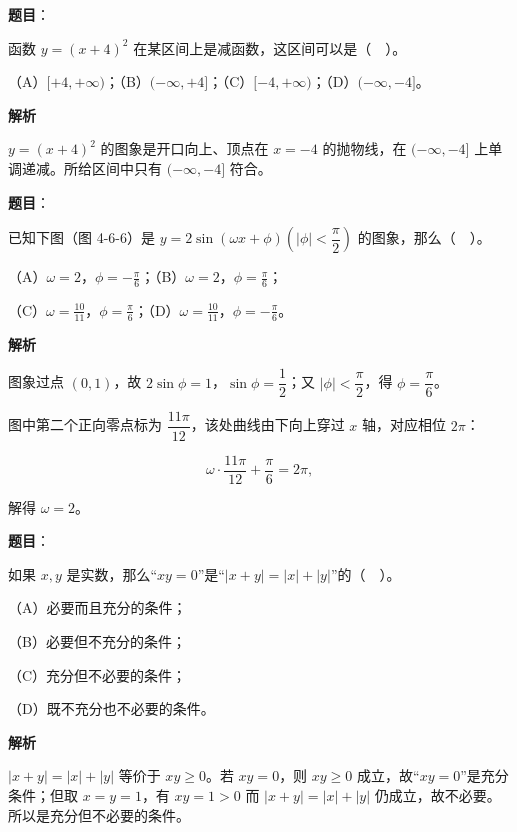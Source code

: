 \begin{answer}

\textbf{题目}：

函数 $y=(x+4)^2$ 在某区间上是减函数，这区间可以是（　）。

（A）$[+4,+\infty)$；（B）$(-\infty,+4]$；（C）$[-4,+\infty)$；（D）$(-\infty,-4]$。

\textbf{解析}

$y=(x+4)^2$ 的图象是开口向上、顶点在 $x=-4$ 的抛物线，在 $(-\infty,-4]$ 上单调递减。所给区间中只有 $(-\infty,-4]$ 符合。


\end{answer}
\begin{answer}

\textbf{题目}：

已知下图（图 4-6-6）是 $y=2\sin(\omega x+\phi)\left(|\phi|<\dfrac{\pi}{2}\right)$ 的图象，那么（　）。

（A）$\omega=2$，$\phi=-\frac{\pi}{6}$；（B）$\omega=2$，$\phi=\frac{\pi}{6}$；

（C）$\omega=\frac{10}{11}$，$\phi=\frac{\pi}{6}$；（D）$\omega=\frac{10}{11}$，$\phi=-\frac{\pi}{6}$。
\nopagebreak[4]
\begin{center}\end{center}
\nopagebreak[4]
\textbf{解析}

图象过点 $(0,1)$，故 $2\sin\phi=1$，$\sin\phi=\dfrac12$；又 $|\phi|<\dfrac{\pi}{2}$，得 $\phi=\dfrac{\pi}{6}$。

图中第二个正向零点标为 $\dfrac{11\pi}{12}$，该处曲线由下向上穿过 $x$ 轴，对应相位 $2\pi$：

\nopagebreak[4]
\[
\omega\cdot\frac{11\pi}{12}+\frac{\pi}{6}=2\pi,
\]

解得 $\omega=2$。


\end{answer}
\begin{answer}

\textbf{题目}：

如果 $x,y$ 是实数，那么“$xy=0$”是“$|x+y|=|x|+|y|$”的（　）。

（A）必要而且充分的条件；

（B）必要但不充分的条件；

（C）充分但不必要的条件；

（D）既不充分也不必要的条件。

\textbf{解析}

$|x+y|=|x|+|y|$ 等价于 $xy\ge 0$。若 $xy=0$，则 $xy\ge0$ 成立，故“$xy=0$”是充分条件；但取 $x=y=1$，有 $xy=1>0$ 而 $|x+y|=|x|+|y|$ 仍成立，故不必要。所以是充分但不必要的条件。


\end{answer}
